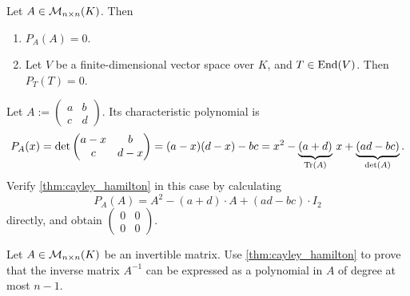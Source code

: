 \begin{theorem}
  \label{thm:cayley_hamilton}
  Let $A \in \mathcal{M}_{n \times n}(K)$. Then
  \begin{enumerate}[label=\textbf{(\alph*)}]
    \item  $P_A(A) = 0$.
    \item Let $V$ be a finite-dimensional vector space over $K$, and $T \in \operatorname{End}(V)$. Then $P_T(T) = 0$.
  \end{enumerate}
\end{theorem}

\begin{exercise}\label{ex:cayley_2x2}
  Let $A := \left(\begin{smallmatrix} a & b \\ c & d \end{smallmatrix}\right)$. Its characteristic polynomial is
  \[ P_A(x) = \det\begin{pmatrix} a-x & b \\ c & d-x \end{pmatrix} = (a-x)(d-x) - bc = x^2 - \underbrace{(a+d)}_{\operatorname{Tr}(A)} \, x + \underbrace{(ad-bc)}_{\det(A)}. \]
  Verify \cref{thm:cayley_hamilton} in this case by calculating
  \[ P_A(A) = A^2 - (a+d) \cdot A + (ad-bc) \cdot I_2 \]
  directly, and obtain $\left(\begin{smallmatrix} 0 & 0 \\ 0 & 0 \end{smallmatrix}\right)$.
\end{exercise}

\begin{exercise}\label{ex:cayley_inverse}
  Let $A \in \mathcal{M}_{n \times n}(K)$ be an invertible matrix. Use \cref{thm:cayley_hamilton} to prove that the inverse matrix $A^{-1}$ can be expressed as a polynomial in $A$ of degree at most $n-1$.
\end{exercise}

